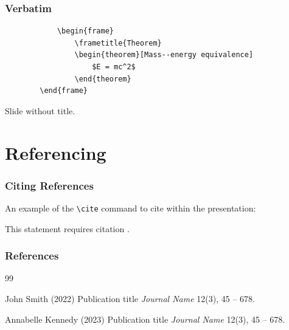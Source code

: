 \documentclass[
	11pt, %
	aspectratio=169, %
]{beamer}
\begin{document}
\begin{frame}[fragile] %
	\frametitle{Verbatim}
	
	\begin{example}
		\begin{verbatim}
			\begin{frame}
				\frametitle{Theorem}
				\begin{theorem}[Mass--energy equivalence]
					$E = mc^2$
				\end{theorem}
		\end{frame}\end{verbatim} %
	\end{example}
\end{frame}


\begin{frame}
	Slide without title.
\end{frame}


\section{Referencing}

\begin{frame}
	\frametitle{Citing References}
	
	An example of the \texttt{\textbackslash cite} command to cite within the presentation:
	
	\bigskip %
	
	This statement requires citation \cite{p1,p2}.
\end{frame}


\begin{frame} %
	\frametitle{References}
	
	\begin{thebibliography}{99} %
		\footnotesize %
		
			John Smith (2022)
			\newblock Publication title
			\newblock \emph{Journal Name} 12(3), 45 -- 678.
			
			Annabelle Kennedy (2023)
			\newblock Publication title
			\newblock \emph{Journal Name} 12(3), 45 -- 678.
	\end{thebibliography}
\end{frame}
\end{document}
